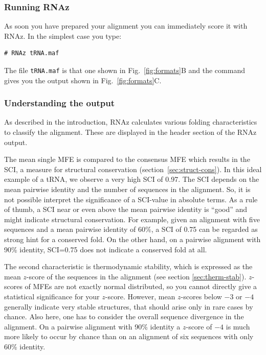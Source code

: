 \documentclass[11pt]{article}
\begin{document}
\subsubsection{Running RNAz}

As soon you have prepared your alignment you can immediately score it with
RNAz. In the simplest case you type:

\begin{verbatim}
# RNAz tRNA.maf
\end{verbatim}

The file \texttt{tRNA.maf} is that one shown in Fig.~\ref{fig:formats}B and
the command gives you the output shown in Fig.~\ref{fig:formats}C.

\subsubsection{Understanding the output}
\label{sec:understanding-output}

As described in the introduction, RNAz calculates various folding
characteristics to classify the alignment. These are displayed in the
header section of the RNAz output.

The mean single MFE is compared to the consensus MFE which results in the
SCI, a measure for structural conservation (section~\ref{sec:struct-cons}).
In this ideal example of a tRNA, we observe a very high SCI of 0.97. The
SCI depends on the mean pairwise identity and the number of sequences in
the alignment.  So, it is not possible interpret the significance of a
SCI-value in absolute terms.  As a rule of thumb, a SCI near or even above
the mean pairwise identity is ``good'' and might indicate structural
conservation.  For example, given an alignment with five sequences and a
mean pairwise identity of 60\%, a SCI of 0.75 can be regarded as strong
hint for a conserved fold. On the other hand, on a pairwise alignment with
90\% identity, SCI=0.75 does not indicate a conserved fold at all.

The second characteristic is thermodynamic stability, which is expressed as
the mean $z$-score of the sequences in the alignment (see section
\ref{sec:therm-stab}). $z$-scores of MFEs are not exactly normal
distributed, so you cannot directly give a statistical significance for
your $z$-score. However, mean $z$-scores below $-3$ or $-4$ generally
indicate very stable structures, that should arise only in rare cases by
chance. Also here, one has to consider the overall sequence divergence in
the alignment. On a pairwise alignment with 90\% identity a $z$-score of
$-4$ is much more likely to occur by chance than on an alignment of six
sequences with only 60\% identity.
\end{document}
